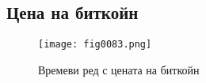 \newpage

\subsection{Цена на биткойн}

\begin{figure}[H]
  \centering
  \texttt{[image: fig0083.png]}
  \caption{Времеви ред с цената на биткойн}
\label{fig0083}
\end{figure}

%
%
%
%
%
%
%

